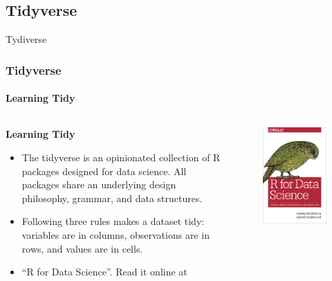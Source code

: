 \documentclass[
	11pt, %
]{beamer}
\begin{document}
\subsection{Tidyverse}
\begin{frame}[fragile]{Tydiverse}
	\frametitle{Tidyverse}
	\framesubtitle{Learning Tidy} %

	\begin{columns}[c] %
		\begin{column}{0.65\textwidth} %
			\textbf{Learning Tidy}
			\begin{itemize}
        \item The tidyverse is an opinionated collection of R packages designed for data science. All packages share       an underlying design philosophy, grammar, and data structures.
        \item Following three rules makes a dataset tidy: variables are in columns, observations are in rows, and values are in cells.

           \item “R for Data Science”. Read it online at \href{https://r4ds.had.co.nz/}{}
			\end{itemize}
		\end{column}
		\begin{column}{0.35\textwidth} %
\begin{figure}
   \includegraphics[width= 0.6\linewidth]{../Figures/tidyverse.png}
\end{figure}
		\end{column}
	\end{columns}
	
	\end{frame}
	
\end{document}
